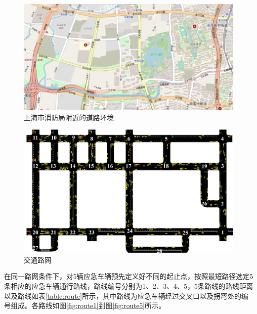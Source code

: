 \begin{figure}[H]
	\centering
	\includegraphics[width=\textwidth]{figures/real_road_network.png}
	\caption{上海市消防局附近的道路环境}
	\label{fig:real_road_network}
\end{figure}

\begin{figure}[H]
	\centering
	\includegraphics[width=\textwidth]{figures/road_network.png}
	\caption{交通路网}
	\label{fig:road_network}
\end{figure}


在同一路网条件下，对5辆应急车辆预先定义好不同的起止点，按照最短路径选定5条相应的应急车辆通行路线，路线编号分别为1、2、3、4、5，5条路线的路线距离以及路线如表\ref{table:route}所示，其中路线为应急车辆经过交叉口以及拐弯处的编号组成。各路线如图\ref{fig:route1}到图\ref{fig:route5}所示。

